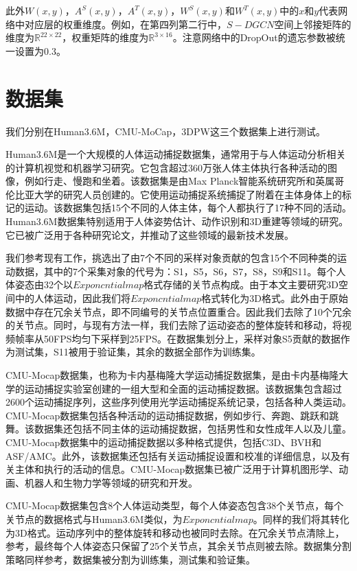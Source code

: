 此外$W(x,y)$，$A^S(x,y)$，$A^T(x,y)$，$W^S(x,y)$和$W^T(x,y)$中的$x$和$y$代表网络中对应层的权重维度。例如，在第四列第二行中，$S-DGCN$空间上邻接矩阵的维度为$\mathbb{R}^{22 \times 22}$，权重矩阵的维度为$\mathbb{R}^{3 \times 16}$。注意网络中的DropOut的遗忘参数被统一设置为0.3。


\section{数据集}
我们分别在Human3.6M\parencite{ionescu2013human3}，CMU-MoCap，3DPW\parencite{von2018recovering}这三个数据集上进行测试。

Human3.6M是一个大规模的人体运动捕捉数据集，通常用于与人体运动分析相关的计算机视觉和机器学习研究。它包含超过360万张人体主体执行各种活动的图像，例如行走、慢跑和坐着。该数据集是由Max Planck智能系统研究所和英属哥伦比亚大学的研究人员创建的。它使用运动捕捉系统捕捉了附着在主体身体上的标记的运动。该数据集包括15个不同的人体主体，每个人都执行了17种不同的活动。Human3.6M数据集特别适用于人体姿势估计、动作识别和3D重建等领域的研究。它已被广泛用于各种研究论文，并推动了这些领域的最新技术发展。

我们参考现有工作，挑选出了由7个不同的采样对象贡献的包含15个不同种类的运动数据，其中的7个采集对象的代号为：S1，S5，S6，S7，S8，S9和S11。每个人体姿态由32个以$Exponcntial map$格式存储的关节点构成。由于本文主要研究3D空间中的人体运动，因此我们将$Exponcntial map$格式转化为3D格式。此外由于原始数据中存在冗余关节点，即不同编号的关节点位置重合。因此我们去除了10个冗余的关节点。同时，与现有方法一样，我们去除了运动姿态的整体旋转和移动，将视频帧率从50FPS均匀下采样到25FPS。在数据集划分上，采样对象S5贡献的数据作为测试集，S11被用于验证集，其余的数据全部作为训练集。

CMU-Mocap数据集，也称为卡内基梅隆大学运动捕捉数据集，是由卡内基梅隆大学的运动捕捉实验室创建的一组大型和全面的运动捕捉数据。该数据集包含超过2600个运动捕捉序列，这些序列使用光学运动捕捉系统记录，包括各种人类运动。CMU-Mocap数据集包括各种活动的运动捕捉数据，例如步行、奔跑、跳跃和跳舞。该数据集还包括不同主体的运动捕捉数据，包括男性和女性成年人以及儿童。CMU-Mocap数据集中的运动捕捉数据以多种格式提供，包括C3D、BVH和ASF/AMC。此外，该数据集还包括有关运动捕捉设置和校准的详细信息，以及有关主体和执行的活动的信息。CMU-Mocap数据集已被广泛用于计算机图形学、动画、机器人和生物力学等领域的研究和开发。

CMU-Mocap数据集包含8个人体运动类型，每个人体姿态包含38个关节点，每个关节点的数据格式与Human3.6M类似，为$Exponcntial map$。同样的我们将其转化为3D格式。运动序列中的整体旋转和移动也被同时去除。在冗余关节点清除上，参考\parencite{dang2021msr,mao2019learning}，最终每个人体姿态只保留了25个关节点，其余关节点则被去除。数据集分割策略同样参考\parencite{dang2021msr,mao2019learning}，数据集被分割为训练集，测试集和验证集。

